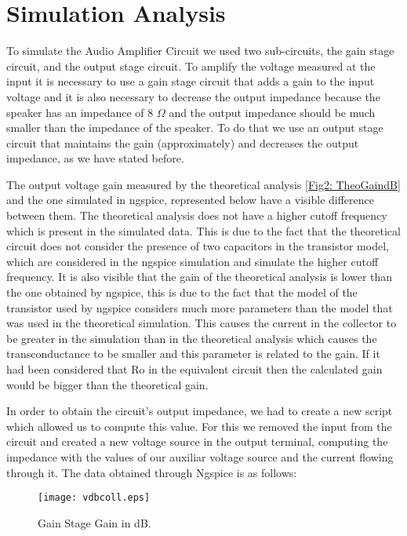 \section{Simulation Analysis}
\label{sec:simulation}
To simulate the Audio Amplifier Circuit we used two sub-circuits, the gain stage circuit, and the output stage circuit.
To amplify the voltage measured at the input it is necessary to use a gain stage circuit that adds a gain to the input voltage and it is also necessary to decrease the output impedance because the speaker has an impedance of 8 $\Omega$ and the output impedance should be much smaller than the impedance of the speaker. To do that we use an output stage circuit that maintains the gain (approximately) and decreases the output impedance, as we have stated before.

The output voltage gain measured by the theoretical analysis \ref{Fig2: TheoGaindB} and the one simulated in ngspice,  represented below have a visible difference between them. The theoretical analysis does not have a higher cutoff frequency which is present in the simulated data. This is due to the fact that the theoretical circuit does not consider the presence of two capacitors in the transistor model, which are considered in the ngspice simulation and simulate the higher cutoff frequency. It is also visible that the gain of the theoretical analysis is lower than the one obtained by ngspice, this is due to the fact that the model of the transistor used by ngspice considers much more parameters than the model that was used in the theoretical simulation. This causes the current in the collector to be greater in the simulation than in the theoretical analysis which causes the transconductance to be smaller and this parameter is related to the gain.
If it had been considered that Ro in the equivalent circuit then the calculated gain would be bigger than the theoretical gain.

In order to obtain the circuit's output impedance, we had to create a new script which allowed us to compute this value. For this we removed the input from the circuit and created a new voltage source in the output terminal, computing the impedance with the values of our auxiliar voltage source and the current flowing through it.
The data obtained through Ngspice is as follows:

\begin{figure}[h] 
\centering
\texttt{[image: vdbcoll.eps]}
\caption{Gain Stage Gain in dB.}
\label{Fig3: GainStgGaindB}
\end{figure}

